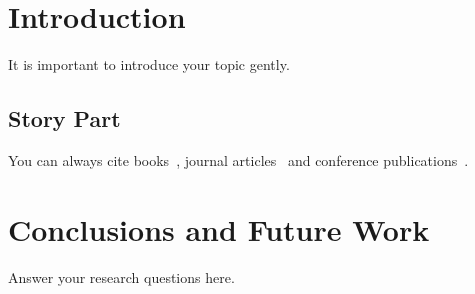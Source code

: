 \documentclass[11pt,fleqn]{report}
\begin{document}
 
\makecoverpage
\tableofcontents
\begin{abstract}      
  State the problem.
  Explain why the problem is a problem.
  Say something surprising.
  Describe consequences of your work

  
  \begin{keywords}    
   computer, science
  \end{keywords}
\end{abstract}


\chapter{Introduction} 
It is important to introduce your topic gently.

\section{Story Part}
You can always cite books~\cite{Grune2012}, journal articles~\cite{Zoo2015} and conference publications~\cite{BabyCobol2020}.

\chapter{Conclusions and Future Work}
Answer your research questions here.



\end{document}
